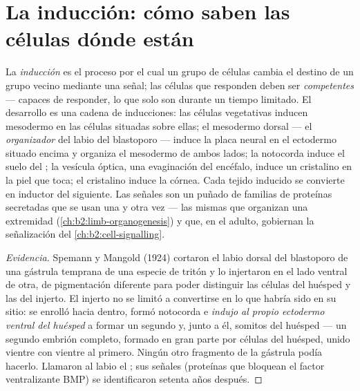 \section{La inducción: cómo saben las células dónde están}

\begin{definition}\label{def:b2:vertebrate-development:induction}
La \emph{inducción} es el proceso por el cual un grupo de células cambia
el destino de un grupo vecino mediante una señal; las células que
responden deben ser \emph{competentes} --- capaces de responder, lo que
solo son durante un tiempo limitado. El desarrollo es una cadena de
inducciones: las células vegetativas inducen mesodermo en las células
situadas sobre ellas; el mesodermo dorsal --- el \emph{organizador} del
labio del blastoporo --- induce la placa neural en el ectodermo situado
encima y organiza el mesodermo de ambos lados; la notocorda induce el
suelo del ; la vesícula óptica, una evaginación del encéfalo,
induce un cristalino en la piel que toca; el cristalino induce la córnea.
Cada tejido inducido se convierte en inductor del siguiente. Las señales
son un puñado de familias de proteínas secretadas que se usan una y otra
vez --- las mismas que organizan una extremidad
(\cref{ch:b2:limb-organogenesis}) y que, en el adulto, gobiernan la
señalización del \cref{ch:b2:cell-signalling}.
\end{definition}
\begin{proof}[Evidencia]
Spemann y Mangold (1924) cortaron el labio dorsal del blastoporo de una
gástrula temprana de una especie de tritón y lo injertaron en el lado
ventral de otra, de pigmentación diferente para poder distinguir las
células del huésped y las del injerto. El injerto no se limitó a
convertirse en lo que habría sido en su sitio: se enrolló hacia dentro,
formó notocorda e \emph{indujo al propio ectodermo ventral del huésped} a
formar un segundo  y, junto a él, somitos del huésped --- un
segundo embrión completo, formado en gran parte por células del huésped,
unido vientre con vientre al primero. Ningún otro fragmento de la
gástrula podía hacerlo. Llamaron al labio el ; sus señales
(proteínas que bloquean el factor ventralizante BMP) se identificaron
setenta años después.
\end{proof}

